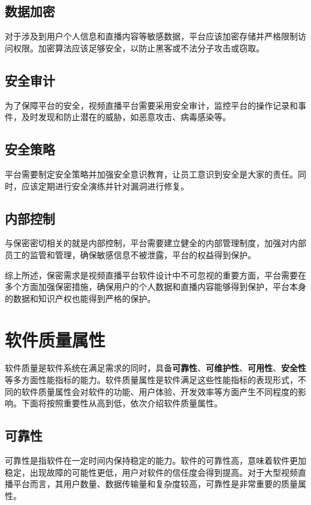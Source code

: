 \subsection{数据加密}

对于涉及到用户个人信息和直播内容等敏感数据，平台应该加密存储并严格限制访问权限。加密算法应该足够安全，以防止黑客或不法分子攻击或窃取。

\subsection{安全审计}

为了保障平台的安全，视频直播平台需要采用安全审计，监控平台的操作记录和事件，及时发现和防止潜在的威胁，如恶意攻击、病毒感染等。

\subsection{安全策略}

平台需要制定安全策略并加强安全意识教育，让员工意识到安全是大家的责任。同时，应该定期进行安全演练并针对漏洞进行修复。

\subsection{内部控制}

与保密密切相关的就是内部控制，平台需要建立健全的内部管理制度，加强对内部员工的监管和管理，确保敏感信息不被泄露，平台的权益得到保护。

综上所述，保密需求是视频直播平台软件设计中不可忽视的重要方面，平台需要在多个方面加强保密措施，确保用户的个人数据和直播内容能够得到保护，平台本身的数据和知识产权也能得到严格的保护。

\section{软件质量属性}

软件质量是软件系统在满足需求的同时，具备\textbf{可靠性}、\textbf{可维护性}、\textbf{可用性}、\textbf{安全性}等多方面性能指标的能力。软件质量属性是软件满足这些性能指标的表现形式，不同的软件质量属性会对软件的功能、用户体验、开发效率等方面产生不同程度的影响。下面将按照重要性从高到低，依次介绍软件质量属性。

\subsection{可靠性}

可靠性是指软件在一定时间内保持稳定的能力。软件的可靠性高，意味着软件更加稳定，出现故障的可能性更低，用户对软件的信任度会得到提高。对于大型视频直播平台而言，其用户数量、数据传输量和复杂度较高，可靠性是非常重要的质量属性。

